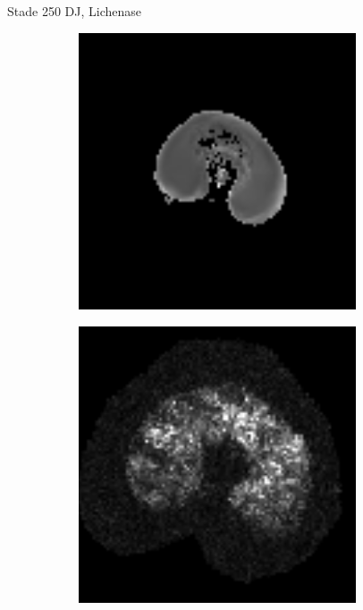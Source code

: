 \documentclass[10pt]{beamer}
\begin{document}
\begin{frame}{Stade 250 DJ, Lichenase}
  \begin{figure}[ht]
    \centering
    \begin{subfigure}[t]{0.33\textwidth}
      \centering
      \includegraphics[width=0.9\textwidth]{fig/stats_250Xyl_t2_irm}
    \end{subfigure}%
    \begin{subfigure}[t]{0.33\textwidth}
      \centering
      \includegraphics[width=0.9\textwidth]{fig/stats_250Lich_t2}
    \end{subfigure}%
    
  \end{figure}
  
\end{frame}
\end{document}
